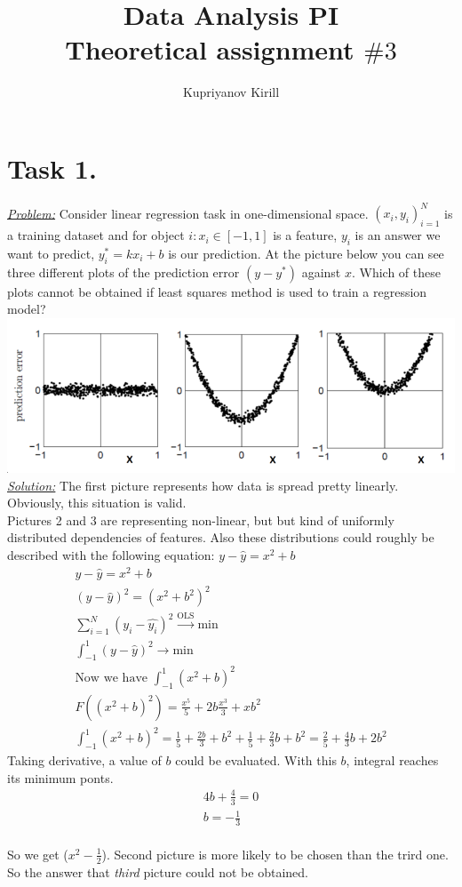 \documentclass[a4paper,12pt]{article}
\author{Kupriyanov Kirill}
\title{Data Analysis PI\\Theoretical assignment $\#3$}
\date{}
\begin{document}
\maketitle
\thispagestyle{empty}
\newpage
\section*{Task 1.}
\underline{\textit{Problem:}} Consider linear regression task in
one-dimensional space. \({(x_i , y_i)}^N_{i=1}\) is a training dataset and
for object \(i: x_i \in [-1, 1]\) is a feature, $y_i$ is an answer we want to
predict, $y_i^*=kx_i+b$ is our prediction. At the picture below you can see
three different plots of the prediction error \((y - y^*)\) against $x$. Which of
these plots cannot be obtained if least squares method is used to train a
regression model?\\
\includegraphics[width=\textwidth]{1}
\newline
\underline{\textit{Solution:}} The first picture represents how data is spread pretty linearly. Obviously, this situation is valid.\\
Pictures 2 and 3 are representing non-linear, but but kind of uniformly
distributed dependencies of features. Also these distributions could roughly be described with the following equation: \(y - \hat{y} = x^2+b\)
\begin{gather}
    y - \hat{y} = x^2 + b\\
    (y - \hat{y})^2 = (x^2 + b^2)^2\\
    \sum^{N}_{i = 1}{(y_i - \hat{y_i})^2} \overset{\text{OLS} }{\rightarrow} \text{min}\\
    \int_{-1}^{1} (y - \hat{y})^2  \rightarrow \text{min}\\
    \text{Now we have } \int_{-1}^{1}(x^2+b)^2\\
    F((x^2+b)^2) = \frac{x^5}{5} + 2b\frac{x^3}{3} + xb^2\\
    \int_{-1}^{1}(x^2 + b)^2 = \frac{1}{5}+\frac{2b}{3} + b^2 + \frac{1}{5} + \frac{2}{3}b + b^2 = \frac{2}{5} + \frac{4}{3}b + 2b^2
\end{gather}
Taking derivative, a value of $b$ could be evaluated. With this $b$, integral reaches its minimum ponts.
\begin{gather}
    4b + \frac{4}{3} = 0\\
    b = -\frac{1}{3}
\end{gather}\\
So we get  ($x^2 - \frac{1}{2}$). Second picture is more likely to be chosen
than the trird one.\\
\newline
So the answer that \textit{third} picture could not be obtained.
\end{document}
